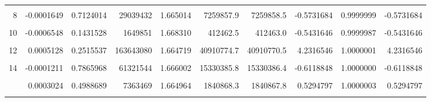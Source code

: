 \documentclass[a4paper]{tufte-handout}
\begin{document}
\begin{table}
{\begin{tabular}[t]{rrrrrrrrrr}
\cellcolor{gray!6}{7} & \cellcolor{gray!6}{-0.0003141} & \cellcolor{gray!6}{0.4824975} & \cellcolor{gray!6}{31822527} & \cellcolor{gray!6}{1.667388} & \cellcolor{gray!6}{7955631.0} & \cellcolor{gray!6}{7955632.1} & \cellcolor{gray!6}{-1.1438998} & \cellcolor{gray!6}{0.9999999} & \cellcolor{gray!6}{-1.1438998}\\
8 & -0.0001649 & 0.7124014 & 29039432 & 1.665014 & 7259857.9 & 7259858.5 & -0.5731684 & 0.9999999 & -0.5731684\\
\cellcolor{gray!6}{9} & \cellcolor{gray!6}{-0.0001918} & \cellcolor{gray!6}{0.6680222} & \cellcolor{gray!6}{16324840} & \cellcolor{gray!6}{1.667192} & \cellcolor{gray!6}{4081210.0} & \cellcolor{gray!6}{4081210.5} & \cellcolor{gray!6}{-0.5002902} & \cellcolor{gray!6}{0.9999999} & \cellcolor{gray!6}{-0.5002902}\\
10 & -0.0006548 & 0.1431528 & 1649851 & 1.668310 & 412462.5 & 412463.0 & -0.5431646 & 0.9999987 & -0.5431646\\
\addlinespace
\cellcolor{gray!6}{11} & \cellcolor{gray!6}{-0.0004414} & \cellcolor{gray!6}{0.3235916} & \cellcolor{gray!6}{39759746} & \cellcolor{gray!6}{1.667619} & \cellcolor{gray!6}{9939935.2} & \cellcolor{gray!6}{9939937.0} & \cellcolor{gray!6}{-1.7972904} & \cellcolor{gray!6}{0.9999998} & \cellcolor{gray!6}{-1.7972904}\\
12 & 0.0005128 & 0.2515537 & 163643080 & 1.664719 & 40910774.7 & 40910770.5 & 4.2316546 & 1.0000001 & 4.2316546\\
\cellcolor{gray!6}{13} & \cellcolor{gray!6}{-0.0004253} & \cellcolor{gray!6}{0.3416042} & \cellcolor{gray!6}{11220099} & \cellcolor{gray!6}{1.666779} & \cellcolor{gray!6}{2805024.3} & \cellcolor{gray!6}{2805025.2} & \cellcolor{gray!6}{-0.9196087} & \cellcolor{gray!6}{0.9999997} & \cellcolor{gray!6}{-0.9196087}\\
14 & -0.0001211 & 0.7865968 & 61321544 & 1.666002 & 15330385.8 & 15330386.4 & -0.6118848 & 1.0000000 & -0.6118848\\
\cellcolor{gray!6}{15} & \cellcolor{gray!6}{-0.0000186} & \cellcolor{gray!6}{0.9668654} & \cellcolor{gray!6}{431531} & \cellcolor{gray!6}{1.665694} & \cellcolor{gray!6}{107883.2} & \cellcolor{gray!6}{107883.2} & \cellcolor{gray!6}{-0.0078751} & \cellcolor{gray!6}{0.9999999} & \cellcolor{gray!6}{-0.0078751}\\
\addlinespace
16 & 0.0003024 & 0.4988689 & 7363469 & 1.664964 & 1840868.3 & 1840867.8 & 0.5294797 & 1.0000003 & 0.5294797\\
\cellcolor{gray!6}{17} & \cellcolor{gray!6}{-0.0000513} & \cellcolor{gray!6}{0.9087598} & \cellcolor{gray!6}{611103876} & \cellcolor{gray!6}{1.666259} & \cellcolor{gray!6}{152775968.7} & \cellcolor{gray!6}{152775969.5} & \cellcolor{gray!6}{-0.8177302} & \cellcolor{gray!6}{1.0000000} & \cellcolor{gray!6}{-0.8177302}\\

\end{tabular}}
\end{table}
\end{document}
